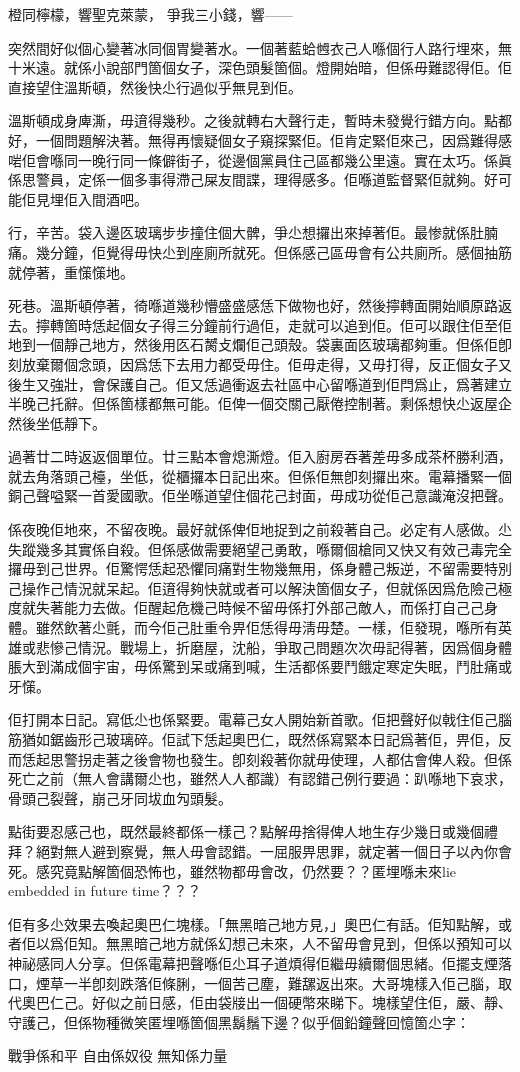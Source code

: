 	橙同檸檬，響聖克萊蒙，
爭我三小錢，響——

突然間好似個心變著冰同個胃變著水。一個著藍蛤乸衣己人喺個行人路行埋來，無十米遠。就係小說部門箇個女子，深色頭髮箇個。燈開始暗，但係毋難認得佢。佢直接望住溫斯頓，然後快尐行過似乎無見到佢。

溫斯頓成身庳澌，毋逳得幾秒。之後就轉右大聲行走，暫時未發覺行錯方向。點都好，一個問題解決著。無得再懷疑個女子窺探緊佢。佢肯定緊佢來己，因爲難得感啱佢會喺同一晚行同一條僻街子，從邊個黨員住己區都幾公里遠。實在太巧。係眞係思警員，定係一個多事得滯己屎友間諜，理得感多。佢喺道監督緊佢就夠。好可能佢見埋佢入間酒吧。

行，辛苦。袋入邊匛玻璃步步撞住個大髀，爭尐想攞出來掉著佢。最惨就係肚腩痛。幾分鐘，佢覺得毋快尐到座廁所就死。但係感己區毋會有公共廁所。感個抽筋就停著，重憡憡地。

死巷。溫斯頓停著，徛喺道幾秒懵盛盛感恁下做物也好，然後擰轉面開始順原路返去。擰轉箇時恁起個女子得三分鐘前行過佢，走就可以追到佢。佢可以跟住佢至佢地到一個靜己地方，然後用匛石膥攴爛佢己頭殼。袋裏面匛玻璃都夠重。但係佢卽刻放棄爾個念頭，因爲恁下去用力都受毋住。佢毋走得，又毋打得，反正個女子又後生又強壯，會保護自己。佢又恁過衝返去社區中心留喺道到佢閂爲止，爲著建立半晚己托辭。但係箇樣都無可能。佢俾一個交關己厭倦控制著。剩係想快尐返屋企然後坐低靜下。

過著廿二時返返個單位。廿三點本會熄澌燈。佢入廚房吞著差毋多成茶杯勝利酒，就去角落頭己檯，坐低，從櫃攞本日記出來。但係佢無卽刻攞出來。電幕播緊一個銅己聲嗌緊一首愛國歌。佢坐喺道望住個花己封面，毋成功從佢己意識淹沒把聲。

係夜晚佢地來，不留夜晚。最好就係俾佢地捉到之前殺著自己。必定有人感做。尐失蹤幾多其實係自殺。但係感做需要絕望己勇敢，喺爾個槍同又快又有效己毒完全攞毋到己世界。佢驚愕恁起恐懼同痛對生物幾無用，係身體己叛逆，不留需要特別己操作己情況就呆起。佢逳得夠快就或者可以解決箇個女子，但就係因爲危險己極度就失著能力去做。佢醒起危機己時候不留毋係打外部己敵人，而係打自己己身體。雖然飲著尐氈，而今佢己肚重令畀佢恁得毋淸毋楚。一樣，佢發現，喺所有英雄或悲慘己情況。戰場上，折磨屋，沈船，爭取己問題次次毋記得著，因爲個身體脹大到滿成個宇宙，毋係驚到呆或痛到喊，生活都係要鬥餓定寒定失眠，鬥肚痛或牙憡。

佢打開本日記。寫低尐也係緊要。電幕己女人開始新首歌。佢把聲好似戟住佢己腦筋猶如鋸齒形己玻璃碎。佢試下恁起奧巴仁，既然係寫緊本日記爲著佢，畀佢，反而恁起思警拐走著之後會物也發生。卽刻殺著你就毋使理，人都估會俾人殺。但係死亡之前（無人會講爾尐也，雖然人人都識）有認錯己例行要過：趴喺地下哀求，骨頭己裂聲，崩己牙同坺血勼頭髮。

點街要忍感己也，既然最終都係一樣己？點解毋捨得俾人地生存少幾日或幾個禮拜？絕對無人避到察覺，無人毋會認錯。一屈服畀思罪，就定著一個日子以內你會死。感究竟點解箇個恐怖也，雖然物都毋會改，仍然要？？匿埋喺未來lie embedded in future time？？？

佢有多尐效果去喚起奧巴仁塊樣。「無黑暗己地方見，」奧巴仁有話。佢知點解，或者佢以爲佢知。無黑暗己地方就係幻想己未來，人不留毋會見到，但係以預知可以神祕感同人分享。但係電幕把聲喺佢尐耳子道煩得佢繼毋續爾個思緒。佢擺支煙落口，煙草一半卽刻跌落佢條脷，一個苦己塵，難𦧲返出來。大哥塊樣入佢己腦，取代奧巴仁己。好似之前日感，佢由袋𤗈出一個硬幣來睇下。塊樣望住佢，嚴、靜、守護己，但係物種微笑匿埋喺箇個黑鬍鬚下邊？似乎個鉛鐘聲回憶箇尐字：

戰爭係和平
自由係奴役
無知係力量


